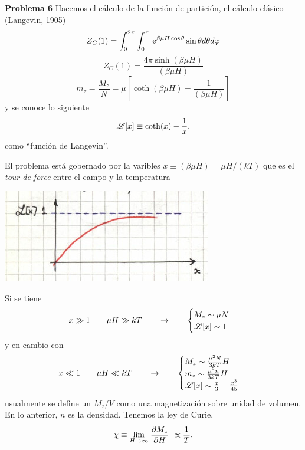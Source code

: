 \documentclass[10pt,oneside]{CBFT_book}
\begin{document}
\begin{ejemplo}{\bf Problema 6}
Hacemos el cálculo de la función de partición, el cálculo clásico (Langevin, 1905)
\[
	Z_C(1) = \int_0^{2\pi} \int_0^\pi \:\mathrm{e}^{ \beta \mu H \cos \theta} \sin\theta d\theta d\varphi
\]
\[
	Z_C(1) = \frac{ 4 \pi \sinh (\beta \mu H)}{ (\beta \mu H) }
\]
\[
	m_z = \frac{M_z}{N} = \mu \left[ \coth (\beta \mu H) - \frac{1}{(\beta \mu H)} \right]
\]
y se conoce lo siguiente
\[
	\mathscr{L} [x] \equiv \coth(x) - \frac{1}{x},
\]
como ``función de Langevin''.

El problema está gobernado por la varibles $x \equiv (\beta \mu H) = \mu H / (k T)$ que es el {\it tour
de force} entre el campo y la temperatura

\includegraphics[scale=0.5]{images/1606329491.jpg}
 
Si se tiene 
\[
	x \gg 1 \qquad \mu H \gg k T \qquad \to \qquad 
	\begin{cases}
		M_z \sim \mu N \\
		\mathscr{L} [x] \sim 1
	\end{cases}
\]
y en cambio con
\[
	x \ll 1 \qquad \mu H \ll k T \qquad \to \qquad 
	\begin{cases}
		M_z \sim \frac{\mu^2 N}{3 k T} H \\
		m_z \sim \frac{\mu^2 n}{3 k T} H \\
		\mathscr{L} [x] \sim  \frac{x}{3} - \frac{x^3}{45}
	\end{cases}
\]
usualmente se define un $M_z/V$ como una magnetización sobre unidad de volumen. En lo anterior, $n$ es
la densidad.
Tenemos la ley de Curie,
\[
	\chi \equiv \lim_{H\to\infty} \left.\frac{\partial^{\hspace{-0.05em}} {M_z}}{\partial {H}^{\hspace{-0.05em}}}\right|_{} \propto \frac{1}{T}.
\]
 
\end{ejemplo}
\end{document}
